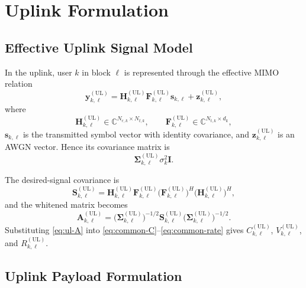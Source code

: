 \documentclass[11pt]{article}
\newcommand{\C}{\mathbb{C}}
\newcommand{\I}{\mathbf{I}}
\newcommand{\Hc}{\mathbf{H}}
\newcommand{\F}{\mathbf{F}}
\newcommand{\A}{\mathbf{A}}
\newcommand{\Sig}{\mathbf{\Sigma}}
\newcommand{\Smat}{\mathbf{S}}
\newcommand{\UL}{\mathrm{UL}}
\begin{document}
\section{Uplink Formulation}

\subsection{Effective Uplink Signal Model}

In the uplink, user $k$ in block $\ell$ is represented through the effective
MIMO relation
\begin{equation}
\mathbf y_{k,\ell}^{(\UL)}
=
\Hc_{k,\ell}^{(\UL)}
\F_{k,\ell}^{(\UL)}
\mathbf s_{k,\ell}
+
\mathbf z_{k,\ell}^{(\UL)},
\label{eq:ul-signal}
\end{equation}
where
\begin{equation}
\Hc_{k,\ell}^{(\UL)} \in \C^{N_{r,k}\times N_{t,k}},
\qquad
\F_{k,\ell}^{(\UL)} \in \C^{N_{t,k}\times d_k},
\label{eq:ul-dimensions}
\end{equation}
$\mathbf s_{k,\ell}$ is the transmitted symbol vector with identity covariance,
and $\mathbf z_{k,\ell}^{(\UL)}$ is an AWGN vector. Hence its covariance matrix
is
\begin{equation}
\Sig_{k,\ell}^{(\UL)}
\sigma_k^2\I.
\label{eq:ul-noise-cov}
\end{equation}

The desired-signal covariance is
\begin{equation}
\Smat_{k,\ell}^{(\UL)}
=
\Hc_{k,\ell}^{(\UL)}
\F_{k,\ell}^{(\UL)}
\bigl(\F_{k,\ell}^{(\UL)}\bigr)^H
\bigl(\Hc_{k,\ell}^{(\UL)}\bigr)^H,
\label{eq:ul-signal-cov}
\end{equation}
and the whitened matrix becomes
\begin{equation}
\A_{k,\ell}^{(\UL)}
=
\bigl(\Sig_{k,\ell}^{(\UL)}\bigr)^{-1/2}
\Smat_{k,\ell}^{(\UL)}
\bigl(\Sig_{k,\ell}^{(\UL)}\bigr)^{-1/2}.
\label{eq:ul-A}
\end{equation}
Substituting \eqref{eq:ul-A} into
\eqref{eq:common-C}--\eqref{eq:common-rate} gives
$C_{k,\ell}^{(\UL)}$, $V_{k,\ell}^{(\UL)}$, and
$R_{k,\ell}^{(\UL)}$.

\subsection{Uplink Payload Formulation}
\end{document}

